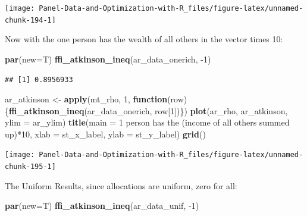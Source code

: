 \documentclass[
]{book}
\newenvironment{Shaded}{\begin{snugshade}}{\end{snugshade}}
\newcommand{\ControlFlowTok}[1]{\textcolor[rgb]{0.13,0.29,0.53}{\textbf{#1}}}
\newcommand{\DataTypeTok}[1]{\textcolor[rgb]{0.13,0.29,0.53}{#1}}
\newcommand{\DecValTok}[1]{\textcolor[rgb]{0.00,0.00,0.81}{#1}}
\newcommand{\KeywordTok}[1]{\textcolor[rgb]{0.13,0.29,0.53}{\textbf{#1}}}
\newcommand{\NormalTok}[1]{#1}
\newcommand{\StringTok}[1]{\textcolor[rgb]{0.31,0.60,0.02}{#1}}
\begin{document}
\begin{center}\texttt{[image: Panel-Data-and-Optimization-with-R\_files/figure-latex/unnamed-chunk-194-1]} \end{center}

Now with the one person has the wealth of all others in the vector times 10:

\begin{Shaded}
\begin{Highlighting}[]
\KeywordTok{par}\NormalTok{(}\DataTypeTok{new=}\NormalTok{T)}
\KeywordTok{ffi\_atkinson\_ineq}\NormalTok{(ar\_data\_onerich, }\DecValTok{{-}1}\NormalTok{)}
\end{Highlighting}
\end{Shaded}

\begin{verbatim}
## [1] 0.8956933
\end{verbatim}

\begin{Shaded}
\begin{Highlighting}[]
\NormalTok{ar\_atkinson \textless{}{-}}\StringTok{ }\KeywordTok{apply}\NormalTok{(mt\_rho, }\DecValTok{1}\NormalTok{, }\ControlFlowTok{function}\NormalTok{(row)\{}\KeywordTok{ffi\_atkinson\_ineq}\NormalTok{(ar\_data\_onerich, row[}\DecValTok{1}\NormalTok{])\})}
\KeywordTok{plot}\NormalTok{(ar\_rho, ar\_atkinson, }\DataTypeTok{ylim =}\NormalTok{ ar\_ylim)}
\KeywordTok{title}\NormalTok{(}\DataTypeTok{main =} \StringTok{\textquotesingle{}1 person has the (income of all others summed up)*10\textquotesingle{}}\NormalTok{, }\DataTypeTok{xlab =}\NormalTok{ st\_x\_label, }\DataTypeTok{ylab =}\NormalTok{ st\_y\_label)}
\KeywordTok{grid}\NormalTok{()}
\end{Highlighting}
\end{Shaded}

\begin{center}\texttt{[image: Panel-Data-and-Optimization-with-R\_files/figure-latex/unnamed-chunk-195-1]} \end{center}

The Uniform Results, since allocations are uniform, zero for all:

\begin{Shaded}
\begin{Highlighting}[]
\KeywordTok{par}\NormalTok{(}\DataTypeTok{new=}\NormalTok{T)}
\KeywordTok{ffi\_atkinson\_ineq}\NormalTok{(ar\_data\_unif, }\DecValTok{{-}1}\NormalTok{)}
\end{Highlighting}
\end{Shaded}
\end{document}
